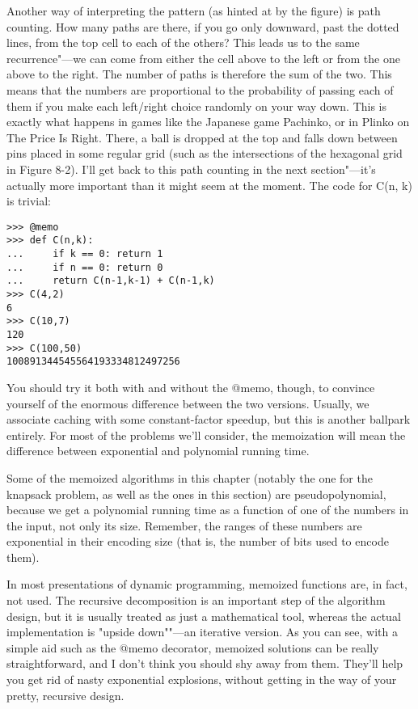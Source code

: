 Another way of interpreting the pattern (as hinted at by the figure) is path counting. How many
paths are there, if you go only downward, past the dotted lines, from the top cell to each of the others? This leads us to the same recurrence"---we can come from either the cell above to the left or from the one above to the right. The number of paths is therefore the sum of the two. This means that the numbers are proportional to the probability of passing each of them if you make each left/right choice randomly on your way down. This is exactly what happens in games like the Japanese game Pachinko, or in Plinko on The Price Is Right. There, a ball is dropped at the top and falls down between pins placed in some regular grid (such as the intersections of the hexagonal grid in Figure 8-2). I'll get back to this path counting in the next section"---it's actually more important than it might seem at the moment.
The code for C(n, k) is trivial:
\begin{lstlisting}
>>> @memo
>>> def C(n,k):
...     if k == 0: return 1
...     if n == 0: return 0
...     return C(n-1,k-1) + C(n-1,k)
>>> C(4,2)
6
>>> C(10,7)
120
>>> C(100,50)
100891344545564193334812497256
\end{lstlisting}
You should try it both with and without the @memo, though, to convince yourself of the enormous
difference between the two versions. Usually, we associate caching with some constant-factor speedup, but this is another ballpark entirely. For most of the problems we'll consider, the memoization will mean the difference between exponential and polynomial running time.


\begin{note}
Some of the memoized algorithms in this chapter (notably the one for the knapsack problem, as well as the ones in this section) are pseudopolynomial, because we get a polynomial running time as a function of one of the numbers in the input, not only its size. Remember, the ranges of these numbers are exponential in their encoding size (that is, the number of bits used to encode them).
\end{note}

In most presentations of dynamic programming, memoized functions are, in fact, not used. The
recursive decomposition is an important step of the algorithm design, but it is usually treated as just a mathematical tool, whereas the actual implementation is "upside down""---an iterative version. As you can see, with a simple aid such as the @memo decorator, memoized solutions can be really straightforward, and I don't think you should shy away from them. They'll help you get rid of nasty exponential explosions, without getting in the way of your pretty, recursive design.

